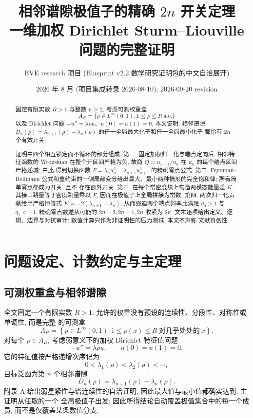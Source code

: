 \documentclass[UTF8]{ctexart}
\title{相邻谱隙极值子的精确 $2n$ 开关定理\\ 一维加权 Dirichlet Sturm--Liouville 问题的完整证明}
\author{BVE research 项目 (Blueprint v2.2 数学研究证明包的中文自洽展开)}
\date{2026 年 8 月 (项目集成转录 2026-08-10); 2026-09-20 revision}
\begin{document}
\maketitle

\begin{abstract}
固定有限实数 $R>1$ 与整数 $n\ge2$, 考虑可测权重盒
\begin{equation*}
	A_R=\{\rho\in L^\infty(0,1):1\le\rho\le R\ \text{a.e.}\}
\end{equation*}
以及 Dirichlet 问题 $-u''=\lambda\rho u$、$u(0)=u(1)=0$. 本文证明: 相邻谱隙
$D_n(\rho)=\lambda_{n+1}(\rho)-\lambda_n(\rho)$ 的任一全局最大化子和任一全局最小化子
都恰有 $2n$ 个有效开关.

证明由四个相互锁定而不循环的部分组成. 第一, 固定加权归一化与端点定向后, 相邻特征函数的
Wronskian 在整个开区间严格为负, 故商 $Q=u_{n+1}/u_n$ 在 $u_n$ 的每个结点区间严格递减; 由此
得到切换函数 $F=\lambda_n u_n^2-\lambda_{n+1}u_{n+1}^2$ 的精确零点公式. 第二, Feynman--Hellmann
公式和盒约束的一侧局部变分给出最大、最小两种情形的完全饱和律; 所有简单零点都成为开关, 且不
存在额外开关. 第三, 在每个常密度块上构造两模态能量差 $K$, 其接口跳量等于密度跳量乘以 $F$,
因而在极值子上全局拼接为常数. 第四, 两次归一化贡献给出严格恒等式 $K=-2(\lambda_{n+1}-\lambda_n)$,
从而强迫两个端点斜率比满足 $q_0>1$ 与 $q_1<-1$, 精确零点数遂从可能的 $2n-2,2n-1,2n$ 收紧为
$2n$. 文末逐项给出定义、逻辑、边界与对抗审计; 数值计算只作为非证明性的压力测试. 本文不声称
文献首创性.
\end{abstract}

\tableofcontents

\section{问题设定、计数约定与主定理}
\subsection{可测权重盒与相邻谱隙}

全文固定一个有限实数 $R>1$. 允许的权重没有预设的连续性、分段性、对称性或单调性, 而是完整
的可测盒
\begin{equation}
	A_R=\left\{\rho\in L^\infty(0,1):1\le\rho(x)\le R\ \text{对几乎处处的}\ x\right\}.
	\label{eq:box}
\end{equation}
对每个 $\rho\in A_R$, 考虑弱意义下的加权 Dirichlet 特征值问题
\begin{equation}
	-u''=\lambda\rho u,\qquad u(0)=u(1)=0 .
	\label{eq:sl}
\end{equation}
它的特征值按严格递增次序记为
\begin{equation}
	0<\lambda_1(\rho)<\lambda_2(\rho)<\cdots,
\end{equation}
目标泛函为第 $n$ 个相邻谱隙
\begin{equation}
	D_n(\rho)=\lambda_{n+1}(\rho)-\lambda_n(\rho) .
	\label{eq:dn}
\end{equation}
附录 A 给出弱星紧性与谱连续性的自洽证明, 因此最大值与最小值都确实达到. 主证明从任取的一个
全局极值子出发; 因此所得结论自动覆盖极值集合中的每一个成员, 而不是仅覆盖某条数值分支.
\end{document}
